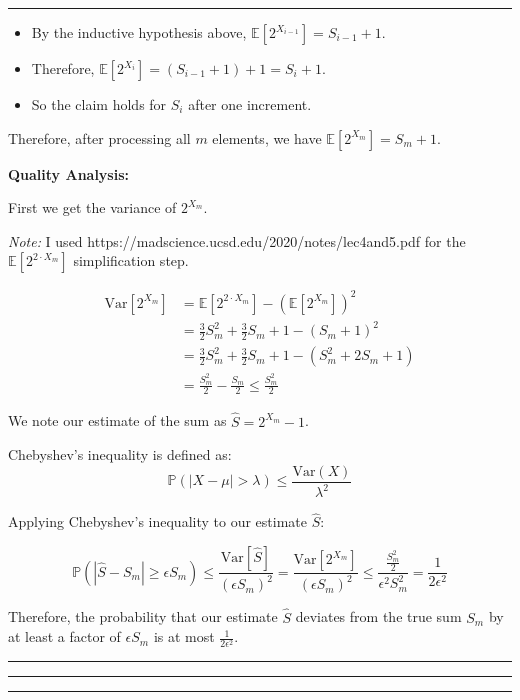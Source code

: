 \documentclass[11pt, english]{article}
\newenvironment{answer}{%
  \par\noindent\hrule %
  \vspace{0.25\baselineskip}%
  \noindent{\Large\bfseries Answer}\par\vspace{0.25\baselineskip}\noindent\ignorespaces
}{%
  \par\vspace{0.5\baselineskip}%
  \noindent\hrule\vspace{0.5\baselineskip}%
  \hrule\hrule
}
\begin{document}
\begin{answer}
\begin{itemize}
\begin{itemize}
\begin{itemize}
          \item $ = \sum_{j=0}^{\infty} \mathbb{P}[X_{i-1} = j] \cdot 2^j + \sum_{j=0}^{\infty} \mathbb{P}[X_{i-1} = j]$
          \item $ = \mathbb{E}[2^{X_{i-1}}] + 1$
        \end{itemize}
        \item By the inductive hypothesis above, $\mathbb{E}[2^{X_{i-1}}] = S_{i-1} + 1$.
        \item Therefore, $\mathbb{E}[2^{X_i}] = (S_{i-1} + 1) + 1 = S_i + 1$.
        \item So the claim holds for $S_i$ after one increment.
    \end{itemize}
\end{itemize}

Therefore, after processing all $m$ elements, we have $\mathbb{E}[2^{X_m}] = S_m + 1$.

\bigskip

\textbf{Quality Analysis:}

First we get the variance of $2^{X_m}$.

\textit{Note:} I used https://madscience.ucsd.edu/2020/notes/lec4and5.pdf for the $\mathbb{E}[2^{2 \cdot X_m}]$ simplification step.

\begin{align*}
\text{Var}[2^{X_m}] &= \mathbb{E}[2^{2 \cdot X_m}] - (\mathbb{E}[2^{X_m}])^2 \\
&= \frac{3}{2} S_m^2 + \frac{3}{2} S_m + 1 - (S_m + 1)^2 \\
&= \frac{3}{2} S_m^2 + \frac{3}{2} S_m + 1 - (S_m^2 + 2 S_m + 1) \\
&= \frac{S_m^2}{2} - \frac{S_m}{2} \leq \frac{S_m^2}{2}
\end{align*}

We note our estimate of the sum as $\hat{S} = 2^{X_m} - 1$.

Chebyshev's inequality is defined as:
\[
\mathbb{P}(|X - \mu| > \lambda) \leq \frac{\text{Var}(X)}{\lambda^2}
\]

Applying Chebyshev's inequality to our estimate $\hat{S}$:

\[
\mathbb{P}(|\hat{S} - S_m| \geq \epsilon S_m) \leq \frac{\text{Var}[\hat{S}]}{(\epsilon S_m)^2} = \frac{\text{Var}[2^{X_m}]}{(\epsilon S_m)^2} \leq \frac{\frac{S_m^2}{2}}{\epsilon^2 S_m^2} = \frac{1}{2 \epsilon^2}
\]

Therefore, the probability that our estimate $\hat{S}$ deviates from the true sum $S_m$ by at least a factor of $\epsilon S_m$ is at most $\frac{1}{2 \epsilon^2}$.



\end{answer}
\end{document}
